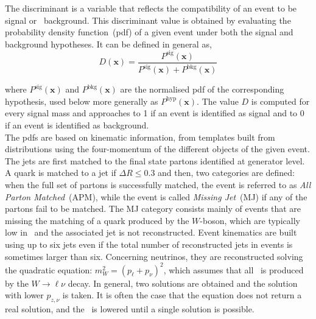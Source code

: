 The discriminant is a variable that reflects the compatibility of an event to be signal or \ttbar\ background. This discriminant value is obtained by evaluating the probability density function~(pdf) of a given event under both the signal and background hypotheses. It can be defined in general as,
\begin{equation}
    D(\textbf{x})=\frac{P^{\text{sig}}(\textbf{x})}{P^{\text{sig}}(\textbf{x})+P^{\text{bkg}}(\textbf{x})}
    \label{eq3:discriminant}
\end{equation}

where $P^{\text{sig}}(\textbf{x})$ and $P^{\text{bkg}}(\textbf{x})$ are the normalised pdf of the corresponding hypothesis, used below more generally as $P^{\text{hyp}}(\textbf{x})$. The value $D$ is computed for every signal mass and approaches to 1 if an event is identified as signal and to 0 if an event is identified as background.\\

The pdfs are based on kinematic information, from templates built from distributions using the four-momentum of the different objects of the given event. The jets are first matched to the final state partons identified at generator level. A quark is matched to a jet if $\Delta R\leq 0.3$ and then, two categories are defined: when the full set of partons is successfully matched, the event is referred to as \textit{All Parton Matched}~(APM), while the event is called \textit{Missing Jet}~(MJ) if any of the partons fail to be matched. The MJ category consists mainly of events that are missing the matching of a quark produced by the $W$-boson, which are typically low in \pT\ and the associated jet is not reconstructed. Event kinematics are built using up to six jets even if the total number of reconstructed jets in events is sometimes larger than six. %
Concerning neutrinos, they are reconstructed solving the quadratic equation: $m_W^2 = (p_\ell + p_\nu)^2$, which assumes that all \MET\ is produced by the $W\to\ell\nu$ decay. In general, two solutions are obtained and the solution with lower $p_{z,\nu}$ is taken. It is often the case that the equation does not return a real solution, and the \MET\ is lowered until a single solution is possible.\\

